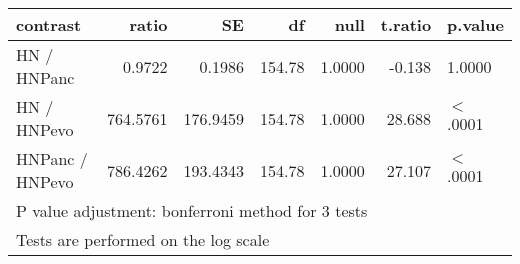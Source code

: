 \begin{table}[ht]
\centering
\begin{tabular}{lrrrrrl}
  \hline
contrast & ratio & SE & df & null & t.ratio & p.value \\ 
  \hline
HN / HNPanc & 0.9722 & 0.1986 & 154.78 & 1.0000 & -0.138 & 1.0000 \\ 
  HN / HNPevo & 764.5761 & 176.9459 & 154.78 & 1.0000 & 28.688 & $<$.0001 \\ 
  HNPanc / HNPevo & 786.4262 & 193.4343 & 154.78 & 1.0000 & 27.107 & $<$.0001 \\ 
   \hline
\multicolumn{7}{l}{{\footnotesize P value adjustment: bonferroni method for 3 tests}}\\

\multicolumn{7}{l}{{\footnotesize Tests are performed on the log scale}}\\
\end{tabular}
\end{table}

